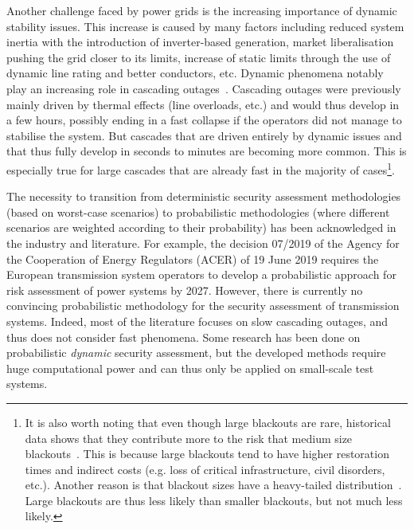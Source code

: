 Another challenge faced by power grids is the increasing importance of dynamic stability issues. This increase is caused by many factors including reduced system inertia with the introduction of inverter-based generation, market liberalisation pushing the grid closer to its limits, increase of static limits through the use of dynamic line rating and better conductors, etc. Dynamic phenomena notably play an increasing role in cascading outages~\cite{cascadeAcceleration}. Cascading outages were previously mainly driven by thermal effects (line overloads, etc.) and would thus develop in a few hours, possibly ending in a fast collapse if the operators did not manage to stabilise the system. But cascades that are driven entirely by dynamic issues and that thus fully develop in seconds to minutes are becoming more common. This is especially true for large cascades that are already fast in the majority of cases\footnote{It is also worth noting that even though large blackouts are rare, historical data shows that they contribute more to the risk that medium size blackouts~\cite{CascadingMethodoAndChallenges, LargeContributeMoreThanMediumBlackouts}. This is because large blackouts tend to have higher restoration times and indirect costs (e.g. loss of critical infrastructure, civil disorders, etc.). Another reason is that blackout sizes have a heavy-tailed distribution~\cite{CascadingMethodoAndChallenges, LargeContributeMoreThanMediumBlackouts}. Large blackouts are thus less likely than smaller blackouts, but not much less likely.
}.

The necessity to transition from deterministic security assessment methodologies (based on worst-case scenarios) to probabilistic methodologies (where different scenarios are weighted according to their probability) has been acknowledged in the industry and literature. For example, the decision 07/2019 of the Agency for the Cooperation of Energy Regulators (ACER) of 19 June 2019 requires the European transmission system operators to develop a probabilistic approach for risk assessment of power systems by 2027. However, there is currently no convincing probabilistic methodology for the security assessment of transmission systems. Indeed, most of the literature focuses on slow cascading outages, and thus does not consider fast phenomena. Some research has been done on probabilistic \textit{dynamic} security assessment, but the developed methods require huge computational power and can thus only be applied on small-scale test systems.

